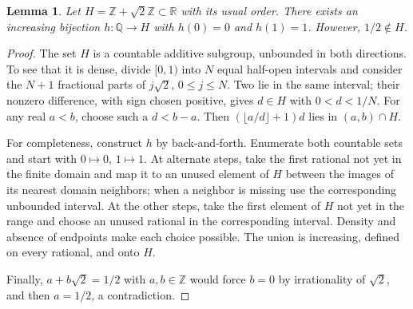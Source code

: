 \documentclass[11pt]{article}
\newtheorem{lemma}{Lemma}
\newcommand{\Q}{\mathbb Q}
\newcommand{\Z}{\mathbb Z}
\newcommand{\R}{\mathbb R}
\begin{document}
\begin{lemma}\label{lem:order}
Let $H=\Z+\sqrt2\Z\subset\R$ with its usual order. There exists an
increasing bijection $h:\Q\to H$ with $h(0)=0$ and $h(1)=1$.
However, $1/2\notin H$.
\end{lemma}
\begin{proof}
The set $H$ is a countable additive subgroup, unbounded in both
directions. To see that it is dense, divide $[0,1)$ into $N$ equal
half-open intervals and consider the $N+1$ fractional parts of
$j\sqrt2$, $0\le j\le N$. Two lie in the same interval; their nonzero
difference, with sign chosen positive, gives $d\in H$ with $0<d<1/N$.
For any real $a<b$, choose such a $d<b-a$. Then
$(\lfloor a/d\rfloor+1)d$ lies in $(a,b)\cap H$.

For completeness, construct $h$ by back-and-forth. Enumerate both
countable sets and start with $0\mapsto0$, $1\mapsto1$. At alternate
steps, take the first rational not yet in the finite domain and map it
to an unused element of $H$ between the images of its nearest domain
neighbors; when a neighbor is missing use the corresponding unbounded
interval. At the other steps, take the first element of $H$ not yet in
the range and choose an unused rational in the corresponding interval.
Density and absence of endpoints make each choice possible. The union
is increasing, defined on every rational, and onto $H$.

Finally, $a+b\sqrt2=1/2$ with $a,b\in\Z$ would force $b=0$ by
irrationality of $\sqrt2$, and then $a=1/2$, a contradiction.
\end{proof}
\end{document}

